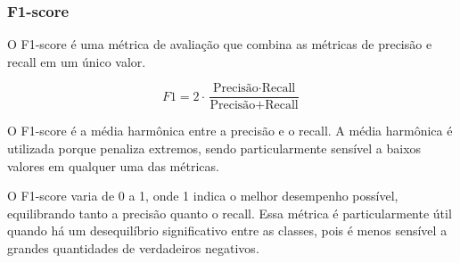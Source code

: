 \subsubsection{F1-score}

O F1-score é uma métrica de avaliação que combina as métricas de precisão e recall em um único valor. 

\begin{equation}
  F1 = 2 \cdot \frac{\text{Precisão} \cdot \text{Recall}}{\text{Precisão} + \text{Recall}}
\end{equation}

O F1-score é a média harmônica entre a precisão e o recall. A média harmônica é utilizada porque penaliza extremos, 
sendo particularmente sensível a baixos valores em qualquer uma das métricas.

O F1-score varia de 0 a 1, onde 1 indica o melhor desempenho possível, equilibrando tanto a precisão quanto o recall.
Essa métrica é particularmente útil quando há um desequilíbrio significativo entre as classes, 
pois é menos sensível a grandes quantidades de verdadeiros negativos.







